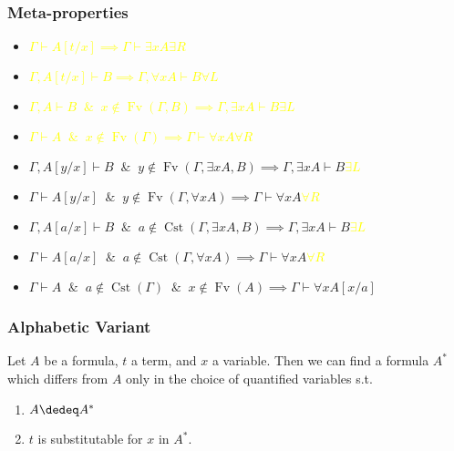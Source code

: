 \documentclass[UTF8,aspectratio=43,11pt,colorlinks,compress,openany]{beamer}%
\begin{document}
\begin{frame}\frametitle{Meta-properties}
	\begin{itemize}
		\item \textcolor{yellow}{$\Gamma\vdash A[t/x]\implies\Gamma\vdash\exists x A$\hfill $\exists R$}
		\item \textcolor{yellow}{$\Gamma, A[t/x]\vdash B\implies\Gamma,\forall x A\vdash B$\hfill $\forall L$}
		\item \textcolor{yellow}{$\Gamma, A\vdash B\;\;\&\;\;x\notin \operatorname{Fv}(\Gamma,B)\implies\Gamma,\exists x A\vdash B$\hfill $\exists L$}
		\item \textcolor{yellow}{$\Gamma\vdash A\;\;\&\;\;x\notin\operatorname{Fv}(\Gamma)\implies\Gamma\vdash\forall x A$\hfill $\forall R$}
		\item $\Gamma, A[y/x]\vdash B\;\;\&\;\;y\notin \operatorname{Fv}(\Gamma,\exists x A, B)\implies\Gamma,\exists x A\vdash B$\hfill \textcolor{yellow}{$\exists L$}
		\item $\Gamma\vdash A[y/x]\;\;\&\;\;y\notin\operatorname{Fv}(\Gamma,\forall x A)\implies\Gamma\vdash\forall x A$\hfill \textcolor{yellow}{$\forall R$}
		\item $\Gamma, A[a/x]\vdash B\;\;\&\;\;a\notin\operatorname{Cst}(\Gamma,\exists x A, B)\implies\Gamma,\exists x A\vdash B$\hfill \textcolor{yellow}{$\exists L$}
		\item $\Gamma\vdash A[a/x]\;\;\&\;\;a\notin\operatorname{Cst}(\Gamma,\forall x A)\implies\Gamma\vdash\forall x A$\hfill \textcolor{yellow}{$\forall R$}
		\item $\Gamma\vdash A\;\;\&\;\;a\notin\operatorname{Cst}(\Gamma)\;\;\&\;\; x\notin\operatorname{Fv}(A)\implies\Gamma\vdash\forall x A[x/a]$
	\end{itemize}
\end{frame}

\begin{frame}\frametitle{Alphabetic Variant}
	\begin{theorem}
		Let $A$ be a formula, $t$ a term, and $x$ a variable. Then we can find a formula $A^*$ which differs from $A$ only in the choice of quantified variables s.t.
		\begin{enumerate}
			\item $A\dedeq A^*$
			\item $t$ is substitutable for $x$ in $A^*$.
		\end{enumerate}
	\end{theorem}
\end{frame}
\end{document}
